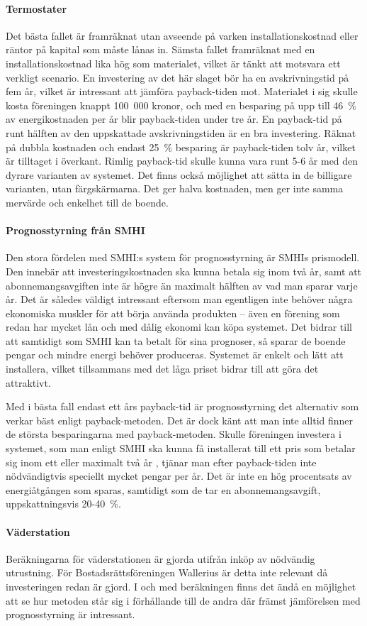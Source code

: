 \paragraph{Termostater}
Det bästa fallet är framräknat utan avseende på varken installationskostnad eller räntor på kapital som måste lånas in. Sämsta fallet framräknat med en installationskostnad lika hög som materialet, vilket är tänkt att motsvara ett verkligt scenario. En investering av det här slaget bör ha en avskrivningstid på fem år, vilket är intressant att jämföra payback-tiden mot. Materialet i sig skulle kosta föreningen knappt 100~000 kronor, och med en besparing på upp till 46~\% av energikostnaden\cite{danfoss} per år blir payback-tiden under tre år. En payback-tid på runt hälften av den uppskattade avskrivningstiden är en bra investering. Räknat på dubbla kostnaden och endast 25~\% besparing är payback-tiden tolv år, vilket är tilltaget i överkant. Rimlig payback-tid skulle kunna vara runt 5-6 år med den dyrare varianten av systemet. Det finns också möjlighet att sätta in de billigare varianten, utan färgskärmarna. Det ger halva kostnaden, men ger inte samma mervärde och enkelhet till de boende.

\paragraph{Prognosstyrning från SMHI}
Den stora fördelen med SMHI:s system för prognosstyrning är SMHIs prismodell. Den innebär att investeringskostnaden ska kunna betala sig inom två år, samt att abonnemangsavgiften inte är högre än maximalt hälften av vad man sparar varje år. Det är således väldigt intressant eftersom man egentligen inte behöver några ekonomiska muskler för att börja använda produkten – även en förening som redan har mycket lån och med dålig ekonomi kan köpa systemet. Det bidrar till att samtidigt som SMHI kan ta betalt för sina prognoser, så sparar de boende pengar och mindre energi behöver produceras. Systemet är enkelt och lätt att installera, vilket tillsammans med det låga priset bidrar till att göra det attraktivt.

Med i bästa fall endast ett års payback-tid är prognosstyrning det alternativ som verkar bäst enligt payback-metoden. Det är dock känt att man inte alltid finner de största besparingarna med payback-metoden. Skulle föreningen investera i systemet, som man enligt SMHI ska kunna få installerat till ett pris som betalar sig inom ett eller maximalt två år \cite{smhi1}\cite{smhi2}, tjänar man efter payback-tiden inte nödvändigtvis speciellt mycket pengar per år. Det är inte en hög procentsats av energiåtgången som sparas, samtidigt som de tar en abonnemangsavgift, uppskattningsvis 20-40~\%. \cite{smhi1}\cite{smhi2}

\paragraph{Väderstation}
Beräkningarna för väderstationen är gjorda utifrån inköp av nödvändig utrustning. För Bostadsrättsföreningen Wallerius är detta inte relevant då investeringen redan är gjord. I och med beräkningen finns det ändå en möjlighet att se hur metoden står sig i förhållande till de andra där främst jämförelsen med prognosstyrning är intressant.
